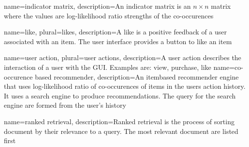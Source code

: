 {
name={indicator matrix},
description={An indicator matrix is an $n \times n$ matrix where the values are log-likelihood ratio strengths of the co-occurences}
}

{
name={like},
plural={likes},
description={A like is a positive feedback of a user associated with an item. The user interface provides a button to like an item}
}

{
name={user action},
plural={user actions},
description={A user action describes the interaction of a user with the GUI. Examples are: view, purchase, like }
}
{
name={co-occurence based recommender},
description={An itembased recommender engine that uses log-likelihood ratio of co-occurences of items in the users action history. It uses a search engine to produce recommendations. The query for the search engine are formed from the user's history }
}

{
name={ranked retrieval},
description={Ranked retrieval is the process of sorting document by their relevance to a query. The most relevant document are listed first}
}
